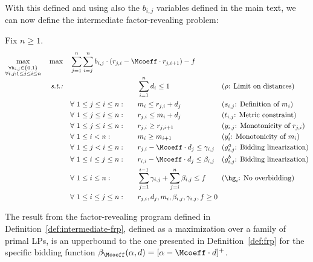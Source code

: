 With this defined and using also the $b_{i,j}$ variables defined in the main text, we can now define the intermediate factor-revealing problem:
\begin{definition}\label{def:intermediate-frp}
    Fix $n\geq 1$.
    \begin{equation*}
        \begin{aligned}
            \smash{\max_{\substack{\\ \forall b_{i,j}\in\{0,1\} \\ \forall i,j: 1\leq j\leq i \leq n}}} \quad 
            \max \quad 
            & \sum_{j=1}^{n} \smash{\sum_{i=j}^{n} b_{i,j} \cdot (r_{j,i} -\Mcoeff \cdot r_{j,i+1}) - f} \span\span\span\span\\
            \text{\emph{s.t.:}} \quad
                &&&\sum_{i=1}^{n} d_i \le 1 && \text{($\rho$: Limit on distances)}\\
                & \forall \ 1 \le j\le i \le n: 
                \quad && m_i \le r_{j,i} + d_j && \text{($s_{i,j}$: Definition of $m_i$)}\\
                & \forall \ 1 \le j \leq i \le n:
                \quad && r_{j,i} \le m_i + d_j && \text{($t_{i,j}$: Metric constraint)}\\
                & \forall \ 1 \le j \le i \le n: 
                \quad &&r_{j,i} \ge r_{j,i+1} && \text{($y_{i,j}$: Monotonicity of $r_{j,i}$)}\\
                & \forall \ 1 \le i < n: 
                \quad && m_i \ge m_{i+1} && \text{($y'_i$: Monotonicity of $m_i$)}\\
                & \forall \ 1\le j <i\le n: 
                \quad && r_{j,i} - \Mcoeff \cdot d_j \le \gamma_{i,j} && \text{($g^a_{i,j}$: Bidding linearization)}\\
                & \forall \ 1\le i\le j\le n: 
                \quad && r_{i,i} -\Mcoeff \cdot d_j \le \beta_{i,j} && \text{($g^b_{i,j}$: Bidding linearization)}\\
                & \forall \ 1\le i\le n: \quad && \sum_{j=1}^{i-1} \gamma_{i,j} + \sum_{j=i}^{n} \beta_{i,j} \le f && \text{($\hg_i$: No overbidding)}\\
                & \forall \ 1\le i\le j\le n: && r_{j,i}, d_{j}, m_i, \beta_{i,j}, \gamma_{i,j}, f \ge 0 \span\span
        \end{aligned}
    \end{equation*}
\end{definition}
\begin{lemma}\label{lemma:generalized-factor-revealing-problem-metric-rewrite}
    The result from the factor-revealing program defined in Definition~\ref{def:intermediate-frp}, defined as a maximization over a family of primal LPs, is an upperbound to the one presented in Definition~\ref{def:frp} for the specific bidding function $\beta_{\Mcoeff}(\alpha, d) = [\alpha - \Mcoeff \cdot d]^+$.
\end{lemma}
